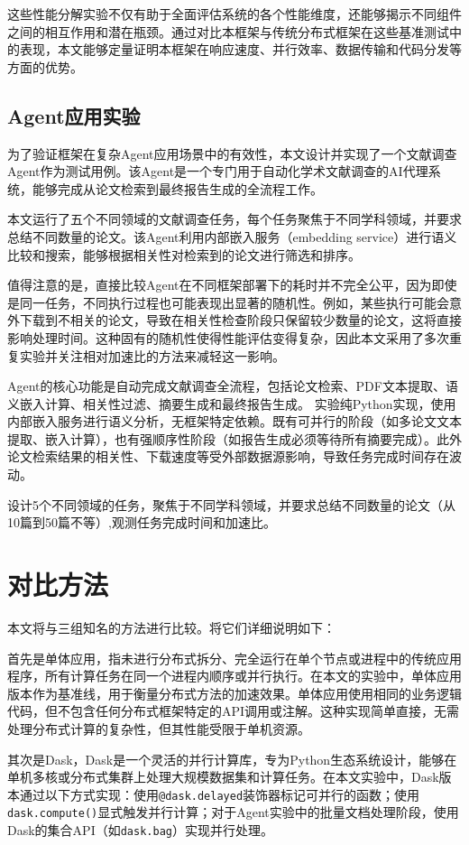 这些性能分解实验不仅有助于全面评估系统的各个性能维度，还能够揭示不同组件之间的相互作用和潜在瓶颈。通过对比本框架与传统分布式框架在这些基准测试中的表现，本文能够定量证明本框架在响应速度、并行效率、数据传输和代码分发等方面的优势。

\subsection{Agent应用实验}{}

为了验证框架在复杂Agent应用场景中的有效性，本文设计并实现了一个文献调查Agent作为测试用例。该Agent是一个专门用于自动化学术文献调查的AI代理系统，能够完成从论文检索到最终报告生成的全流程工作。

本文运行了五个不同领域的文献调查任务，每个任务聚焦于不同学科领域，并要求总结不同数量的论文。该Agent利用内部嵌入服务（embedding service）进行语义比较和搜索，能够根据相关性对检索到的论文进行筛选和排序。

值得注意的是，直接比较Agent在不同框架部署下的耗时并不完全公平，因为即使是同一任务，不同执行过程也可能表现出显著的随机性。例如，某些执行可能会意外下载到不相关的论文，导致在相关性检查阶段只保留较少数量的论文，这将直接影响处理时间。这种固有的随机性使得性能评估变得复杂，因此本文采用了多次重复实验并关注相对加速比的方法来减轻这一影响。

Agent的核心功能是自动完成文献调查全流程，包括论文检索、PDF文本提取、语义嵌入计算、相关性过滤、摘要生成和最终报告生成。
实验纯Python实现，使用内部嵌入服务进行语义分析，无框架特定依赖。既有可并行的阶段（如多论文文本提取、嵌入计算），也有强顺序性阶段（如报告生成必须等待所有摘要完成）。此外论文检索结果的相关性、下载速度等受外部数据源影响，导致任务完成时间存在波动。

设计5个不同领域的任务，聚焦于不同学科领域，并要求总结不同数量的论文（从10篇到50篇不等）,观测任务完成时间和加速比。

\section{对比方法}

本文将与三组知名的方法进行比较。将它们详细说明如下：

首先是单体应用，指未进行分布式拆分、完全运行在单个节点或进程中的传统应用程序，所有计算任务在同一个进程内顺序或并行执行。在本文的实验中，单体应用版本作为基准线，用于衡量分布式方法的加速效果。单体应用使用相同的业务逻辑代码，但不包含任何分布式框架特定的API调用或注解。这种实现简单直接，无需处理分布式计算的复杂性，但其性能受限于单机资源。

其次是Dask，Dask是一个灵活的并行计算库，专为Python生态系统设计，能够在单机多核或分布式集群上处理大规模数据集和计算任务。在本文实验中，Dask版本通过以下方式实现：使用\texttt{@dask.delayed}装饰器标记可并行的函数；使用\texttt{dask.compute()}显式触发并行计算；对于Agent实验中的批量文档处理阶段，使用Dask的集合API（如\texttt{dask.bag}）实现并行处理。

